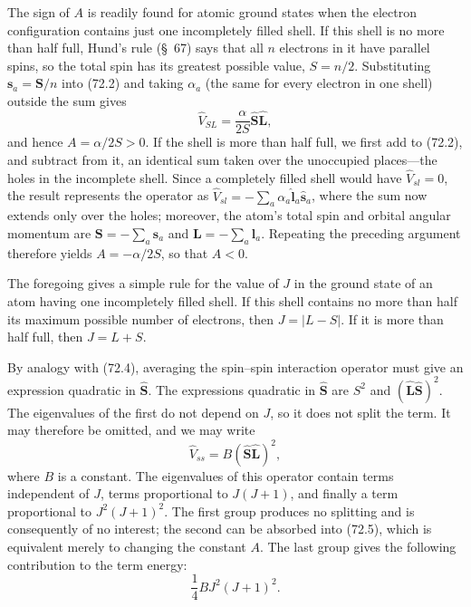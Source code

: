 

The sign of $A$ is readily found for atomic ground states when the electron configuration contains just one incompletely filled shell. If this shell is no more than half full, Hund's rule (\S~67) says that all $n$ electrons in it have parallel spins, so the total spin has its greatest possible value, $S=n/2$. Substituting $\mathbf s_a=\mathbf S/n$ into (72.2) and taking $\alpha_a$ (the same for every electron in one shell) outside the sum gives
\[
 \hat V_{SL}=\frac{\alpha}{2S}\hat{\mathbf S}\hat{\mathbf L},
\]
and hence $A=\alpha/2S>0$. If the shell is more than half full, we first add to (72.2), and subtract from it, an identical sum taken over the unoccupied places---the holes in the incomplete shell. Since a completely filled shell would have $\hat V_{sl}=0$, the result represents the operator as $\hat V_{sl}=-\sum_a\alpha_a\hat{\mathbf l}_a\hat{\mathbf s}_a$, where the sum now extends only over the holes; moreover, the atom's total spin and orbital angular momentum are $\mathbf S=-\sum_a\mathbf s_a$ and $\mathbf L=-\sum_a\mathbf l_a$. Repeating the preceding argument therefore yields $A=-\alpha/2S$, so that $A<0$.

The foregoing gives a simple rule for the value of $J$ in the ground state of an atom having one incompletely filled shell. If this shell contains no more than half its maximum possible number of electrons, then $J=|L-S|$. If it is more than half full, then $J=L+S$.



By analogy with (72.4), averaging the spin--spin interaction operator must give an expression quadratic in $\hat{\mathbf S}$. The expressions quadratic in $\hat{\mathbf S}$ are $S^2$ and $(\hat{\mathbf L}\hat{\mathbf S})^2$. The eigenvalues of the first do not depend on $J$, so it does not split the term. It may therefore be omitted, and we may write
\begin{equation}
 \hat V_{ss}=B(\hat{\mathbf S}\hat{\mathbf L})^2,
 \tag{72.7}
\end{equation}
where $B$ is a constant. The eigenvalues of this operator contain terms independent of $J$, terms proportional to $J(J+1)$, and finally a term proportional to $J^2(J+1)^2$. The first group produces no splitting and is consequently of no interest; the second can be absorbed into (72.5), which is equivalent merely to changing the constant $A$. The last group gives the following contribution to the term energy:
\begin{equation}
 \frac14BJ^2(J+1)^2.
 \tag{72.8}
\end{equation}

